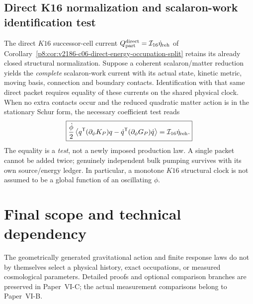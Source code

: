 \documentclass[12pt,a4paper]{article}
\begin{document}
\subsection{Direct K16 normalization and scalaron-work identification test}
\label{p8:sec:v229-k16-scalaron-owner-ledger}
\begin{corollary}
\label{p8:cor:v229-k16-scalaron-current-equality}
The direct $K16$ successor-cell current
$Q_{\rm part}^{\rm direct}=\mathcal I_{16}\dot\eta_{\rm reh}$
of Corollary~\ref{p8:cor:v2186-c06-direct-energy-occupation-split}
retains its already closed structural normalization.  Suppose a
coherent scalaron/matter reduction yields the \emph{complete}
scalaron-work current with its actual state, kinetic metric, moving
basis, connection and boundary contacts.  Identification with that
same direct packet requires equality of these currents on the shared
physical clock.  When no extra contacts occur and the reduced
quadratic matter action is in the stationary Schur form, the
necessary coefficient test reads
\[
 \boxed{\frac{\dot\phi}{2}\left\langle
 q^{\mathsf T}(\partial_\phi K_P)q
 -\dot q^{\mathsf T}(\partial_\phi G_P)\dot q
 \right\rangle
 =\mathcal I_{16}\dot\eta_{\rm reh}.}
\]
The equality is a \emph{test}, not a newly imposed production law.
A single packet cannot be added twice; genuinely independent bulk
pumping survives with its own source/energy ledger.  In particular,
a monotone $K16$ structural clock is not assumed to be a global
function of an oscillating $\phi$.
\end{corollary}



\section*{Final scope and technical dependency}
The geometrically generated gravitational action and finite response laws do not by themselves select a physical history, exact occupations, or measured cosmological parameters. Detailed proofs and optional comparison branches are preserved in Paper~VI-C; the actual measurement comparisons belong to Paper~VI-B.

\end{document}
